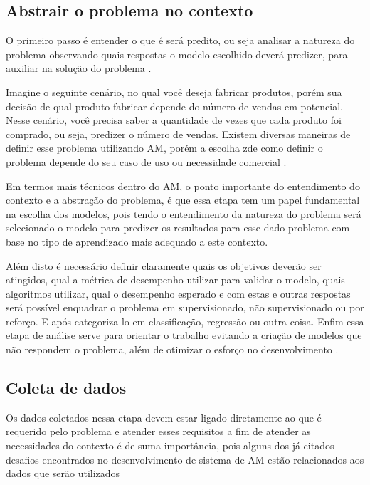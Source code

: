 \subsection{Abstrair o problema no contexto}
O primeiro passo é entender o que é será predito, ou seja analisar a natureza do problema observando quais respostas o modelo escolhido deverá predizer, para auxiliar na solução do problema \cite{geron2017hands}.

Imagine o seguinte cenário, no qual você deseja fabricar produtos, porém sua decisão de qual produto fabricar depende do número de vendas em potencial. Nesse cenário, você precisa saber a quantidade de vezes que cada produto foi comprado, ou seja, predizer o número de vendas. Existem diversas maneiras de definir esse problema utilizando AM, porém a escolha  zde como definir o problema depende do seu caso de uso ou necessidade comercial \cite{Amazon}.

Em termos mais técnicos dentro do AM, o ponto importante do entendimento do contexto e a abstração do problema, é que essa etapa tem um papel fundamental na escolha dos modelos, pois tendo o entendimento da natureza do problema será selecionado o modelo para predizer os resultados para esse dado problema com base no tipo de aprendizado mais adequado a este contexto.

Além disto é necessário definir claramente quais os objetivos deverão ser atingidos, qual a métrica de desempenho utilizar para validar o modelo, quais algoritmos utilizar, qual o desempenho esperado e com estas e outras respostas será possível enquadrar o problema em supervisionado, não supervisionado ou por reforço. E após categoriza-lo em classificação, regressão ou outra coisa\cite{geron2017hands}. Enfim essa etapa de análise serve para orientar o trabalho evitando a criação de modelos que não respondem o problema, além de otimizar o esforço no desenvolvimento \cite{Amazon}.

\subsection{Coleta de dados}

Os dados coletados nessa etapa devem estar ligado diretamente ao que é requerido pelo problema e atender esses requisitos a fim de atender as necessidades do contexto é de suma importância, pois alguns dos já citados desafios encontrados no desenvolvimento de sistema de AM estão relacionados aos dados que serão utilizados \cite{geron2017hands}

